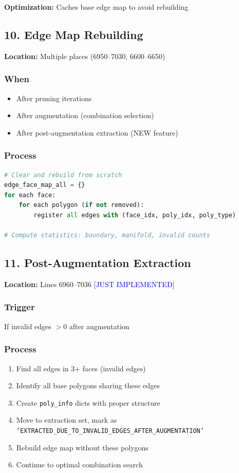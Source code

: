 \documentclass[11pt]{article}
\begin{document}
\textbf{Optimization:} Caches base edge map to avoid rebuilding

\subsection{10. Edge Map Rebuilding}
\textbf{Location:} Multiple places (6950--7030, 6600--6650)

\subsubsection{When}
\begin{itemize}
    \item After pruning iterations
    \item After augmentation (combination selection)
    \item After post-augmentation extraction (NEW feature)
\end{itemize}

\subsubsection{Process}
\begin{lstlisting}[language=Python]
# Clear and rebuild from scratch
edge_face_map_all = {}
for each face:
    for each polygon (if not removed):
        register all edges with (face_idx, poly_idx, poly_type)
        
# Compute statistics: boundary, manifold, invalid counts
\end{lstlisting}

\subsection{11. Post-Augmentation Extraction}
\textbf{Location:} Lines 6960--7036 \textcolor{blue}{[JUST IMPLEMENTED]}

\subsubsection{Trigger}
If invalid edges $> 0$ after augmentation

\subsubsection{Process}
\begin{enumerate}
    \item Find all edges in 3+ faces (invalid edges)
    \item Identify all base polygons sharing these edges
    \item Create \texttt{poly\_info} dicts with proper structure
    \item Move to extraction set, mark as \texttt{'EXTRACTED\_DUE\_TO\_INVALID\_EDGES\_AFTER\_AUGMENTATION'}
    \item Rebuild edge map without these polygons
    \item Continue to optimal combination search
\end{enumerate}
\end{document}
